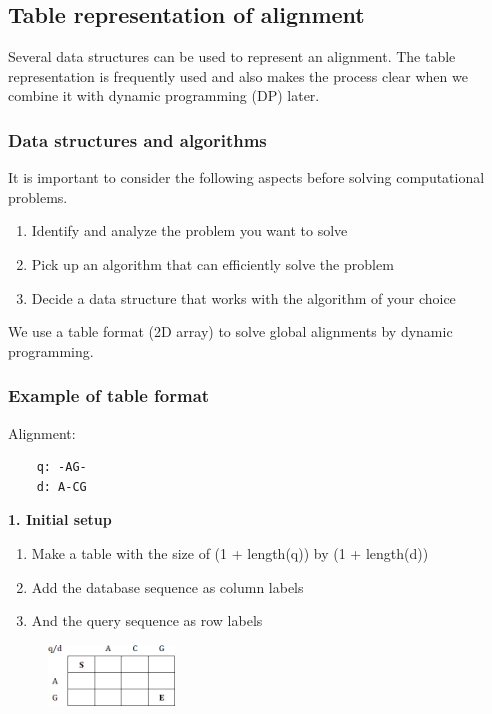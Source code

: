 %
%

%
%
\subsection{Table representation of alignment}
Several data structures can be used to represent an alignment. The table representation is frequently used and also makes the process clear when we combine it with dynamic programming (DP) later.

\subsubsection*{Data structures and algorithms}
It is important to consider the following aspects before solving computational problems.
\begin{enumerate}
\item Identify and analyze the problem you want to solve
\item Pick up an algorithm that can efficiently solve the problem
\item Decide a data structure that works with the algorithm of your choice
\end{enumerate}

\noindent We use a table format (2D array) to solve global alignments by dynamic programming.

\subsubsection*{Example of table format}
Alignment:
\begin{verbatim}
    q: -AG-
    d: A-CG
\end{verbatim}
\medskip 

\noindent \textbf{1. Initial setup}

\begin{enumerate}
\item Make a table with the size of (1 + length(q)) by (1 + length(d))
\item Add the database sequence as column labels
\item And the query sequence as row labels
\end{enumerate}

\begin{figure}[H]
  \centering
      \includegraphics[width=0.3\textwidth]{fig02/alignment_to_table.png}
\end{figure}

